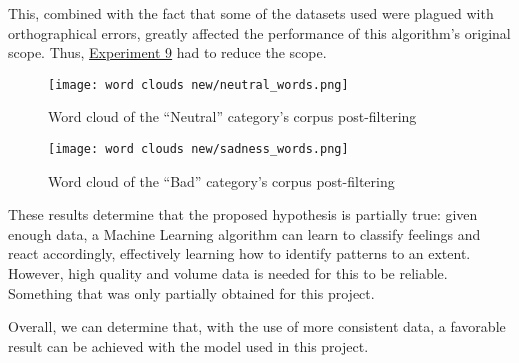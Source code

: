 This, combined with the fact that some of the datasets used were plagued with orthographical errors, greatly affected the performance of this algorithm's original scope. Thus, \hyperref[exp9]{Experiment 9} had to reduce the scope.

\begin{figure}[!h]
	\centering
	\texttt{[image: word clouds new/neutral\_words.png]}
	\caption{Word cloud of the ``Neutral'' category's corpus post-filtering}
	\label{fig:neutralwords_post}
	\vspace{1cm}
	\texttt{[image: word clouds new/sadness\_words.png]}
	\caption{Word cloud of the ``Bad'' category's corpus post-filtering}
	\label{fig:sadnesswords_post}
\end{figure}

These results determine that the proposed hypothesis is partially true: given enough data, a Machine Learning algorithm can learn to classify feelings and react accordingly, effectively learning how to identify patterns to an extent. However, high quality and volume data is needed for this to be reliable. Something that was only partially obtained for this project.

Overall, we can determine that, with the use of more consistent data, a favorable result can be achieved with the model used in this project.